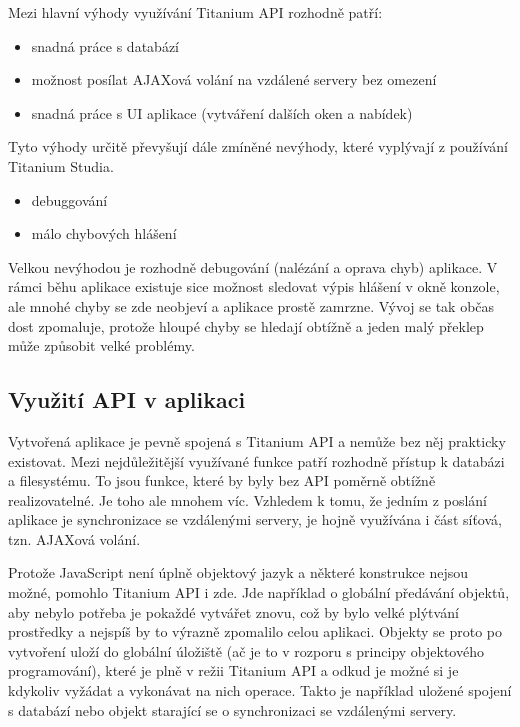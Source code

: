 Mezi hlavní výhody využívání Titanium API rozhodně patří:

\begin{itemize}
\item snadná práce s databází
\item možnost posílat AJAXová volání na vzdálené servery bez omezení
\item snadná práce s UI aplikace (vytváření dalších oken a nabídek)
\end{itemize}

Tyto výhody určitě převyšují dále zmíněné nevýhody, které vyplývají z používání Titanium Studia.

\begin{itemize}
\item debuggování
\item málo chybových hlášení
\end{itemize}

Velkou nevýhodou je rozhodně debugování (nalézání a oprava chyb) aplikace. V rámci běhu aplikace existuje sice možnost sledovat výpis hlášení v okně konzole, ale mnohé chyby se zde neobjeví a aplikace prostě zamrzne. Vývoj se tak občas dost zpomaluje, protože hloupé chyby se hledají obtížně a jeden malý překlep může způsobit velké problémy.

\subsection{Využití API v aplikaci}

Vytvořená aplikace je pevně spojená s Titanium API a nemůže bez něj prakticky existovat. Mezi nejdůležitější využívané funkce patří rozhodně přístup k databázi a filesystému. To jsou funkce, které by byly bez API poměrně obtížně realizovatelné. Je toho ale mnohem víc. Vzhledem k tomu, že jedním z poslání aplikace je synchronizace se vzdálenými servery, je hojně využívána i část síťová, tzn. AJAXová volání. 

Protože JavaScript není úplně objektový jazyk a některé konstrukce nejsou možné, pomohlo Titanium API i zde. Jde například o globální předávání objektů, aby nebylo potřeba je pokaždé vytvářet znovu, což by bylo velké plýtvání prostředky a nejspíš by to výrazně zpomalilo celou aplikaci. Objekty se proto po vytvoření uloží do globální úložiště (ač je to v rozporu s principy objektového programování), které je plně v režii Titanium API a odkud je možné si je kdykoliv vyžádat a vykonávat na nich operace. Takto je například uložené spojení s databází nebo objekt starající se o synchronizaci se vzdálenými servery.

